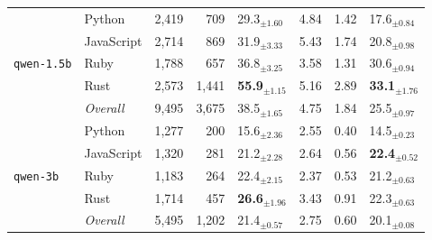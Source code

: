\begin{longtable}{@{}llrrp{0.72cm}rrp{0.72cm}@{}}
      \multirow{5}{*}{\texttt{qwen-1.5b}} & Python & 2,419 & 709 & 29.3$_{\pm 1.60}$ & 4.84 & 1.42 & 17.6$_{\pm 0.84}$ \\
       & JavaScript & 2,714 & 869 & 31.9$_{\pm 3.33}$ & 5.43 & 1.74 & 20.8$_{\pm 0.98}$ \\
       & Ruby & 1,788 & 657 & 36.8$_{\pm 3.25}$ & 3.58 & 1.31 & 30.6$_{\pm 0.94}$ \\
       & Rust & 2,573 & 1,441 & \textbf{55.9$_{\pm 1.15}$} & 5.16 & 2.89 & \textbf{33.1$_{\pm 1.76}$} \\ \cmidrule(lr){2-8}
      & \textit{Overall} & 9,495 & 3,675 & 38.5$_{\pm 1.65}$ & 4.75 & 1.84 & 25.5$_{\pm 0.97}$ \\
    \midrule

      \multirow{5}{*}{\texttt{qwen-3b}} & Python & 1,277 & 200 & 15.6$_{\pm 2.36}$ & 2.55 & 0.40 & 14.5$_{\pm 0.23}$ \\
       & JavaScript & 1,320 & 281 & 21.2$_{\pm 2.28}$ & 2.64 & 0.56 & \textbf{22.4$_{\pm 0.52}$} \\
       & Ruby & 1,183 & 264 & 22.4$_{\pm 2.15}$ & 2.37 & 0.53 & 21.2$_{\pm 0.63}$ \\
       & Rust & 1,714 & 457 & \textbf{26.6$_{\pm 1.96}$} & 3.43 & 0.91 & 22.3$_{\pm 0.63}$ \\ \cmidrule(lr){2-8}
      & \textit{Overall} & 5,495 & 1,202 & 21.4$_{\pm 0.57}$ & 2.75 & 0.60 & 20.1$_{\pm 0.08}$ \\
  \midrule[1.2pt]









\end{longtable}
